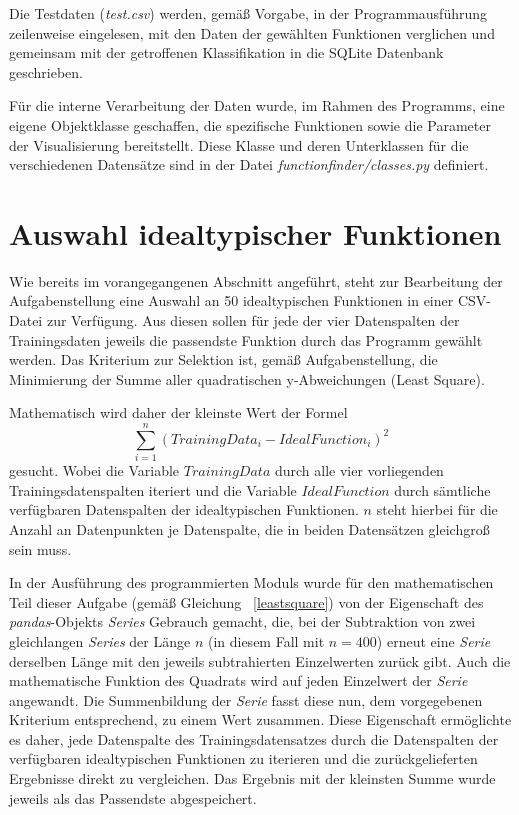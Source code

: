 Die Testdaten (\emph{test.csv}) werden, gemäß Vorgabe, in der Programmausführung zeilenweise eingelesen, mit den Daten der gewählten Funktionen verglichen und gemeinsam mit der getroffenen Klassifikation in die SQLite Datenbank geschrieben.

Für die interne Verarbeitung der Daten wurde, im Rahmen des Programms, eine eigene Objektklasse geschaffen, die spezifische Funktionen sowie die Parameter der Visualisierung bereitstellt. Diese Klasse und deren Unterklassen für die verschiedenen Datensätze sind in der Datei \emph{functionfinder/classes.py} definiert.

\section{Auswahl idealtypischer Funktionen}

Wie bereits im vorangegangenen Abschnitt angeführt, steht zur Bearbeitung der Aufgabenstellung eine Auswahl an 50 idealtypischen Funktionen in einer CSV-Datei zur Verfügung. Aus diesen sollen für jede der vier Datenspalten der Trainingsdaten jeweils die passendste Funktion durch das Programm gewählt werden. Das Kriterium zur Selektion ist, gemäß Aufgabenstellung, die Minimierung der Summe aller quadratischen y-Abweichungen (Least Square).

Mathematisch wird daher der kleinste Wert der Formel
\begin{equation}  
\sum_{i=1}^{n}(TrainingData_{i} - IdealFunction_{i})^2
\label{leastsquare}
\end{equation}
gesucht. Wobei die Variable $TrainingData$ durch alle vier vorliegenden Trainingsdatenspalten iteriert und die Variable $IdealFunction$ durch sämtliche verfügbaren Datenspalten der idealtypischen Funktionen. $n$ steht hierbei für die Anzahl an Datenpunkten je Datenspalte, die in beiden Datensätzen gleichgroß sein muss. 

In der Ausführung des programmierten Moduls wurde für den mathematischen Teil dieser Aufgabe (gemäß Gleichung ~\ref{leastsquare})  von der Eigenschaft des \emph{pandas}-Objekts \emph{Series} Gebrauch gemacht, die, bei der Subtraktion von zwei gleichlangen \emph{Series} der Länge $n$ (in diesem Fall mit $n=400$) erneut eine \emph{Serie} derselben Länge mit den jeweils subtrahierten Einzelwerten zurück gibt. Auch die mathematische Funktion des Quadrats wird auf jeden Einzelwert der \emph{Serie} angewandt. Die Summenbildung der \emph{Serie} fasst diese nun, dem vorgegebenen Kriterium entsprechend, zu einem Wert zusammen.
Diese Eigenschaft ermöglichte es daher, jede Datenspalte des Trainingsdatensatzes durch die Datenspalten der verfügbaren idealtypischen Funktionen zu iterieren und die zurückgelieferten Ergebnisse direkt zu vergleichen. Das Ergebnis mit der kleinsten Summe wurde jeweils als das Passendste abgespeichert.

